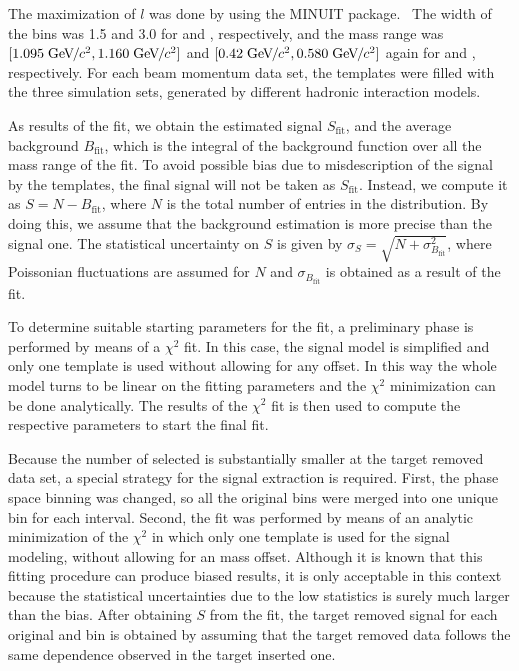 The maximization of $l$ was done by using the
MINUIT package.~\cite{James:1975dr} The width
of the \minv bins was 1.5 and 3.0 \MeVcc for
\lambs and \kzeros, respectively, and the mass range
was $[1.095\;\mbox{Ge\kern-0.1em V}\kern-0.1em/\kern-0.05em c^2, 1.160\;\mbox{Ge\kern-0.1em V}\kern-0.1em/\kern-0.05em c^2]$ and $[0.42\;\mbox{Ge\kern-0.1em V}\kern-0.1em/\kern-0.05em c^2, 0.580\;\mbox{Ge\kern-0.1em V}\kern-0.1em/\kern-0.05em c^2]$  
again for \lambs and \kzeros, respectively.
For each beam momentum data set, the templates were filled
with the three simulation sets, generated by different
hadronic interaction models.

As results of the fit, we obtain the estimated signal
$S_\text{fit}$, and the average background $B_\text{fit}$, which is the integral
of the background function over all the mass range of the fit.
To avoid possible bias due to misdescription of the signal
by the templates, the final signal will not be taken as $S_\text{fit}$.
Instead, we compute it as $S = N - B_\text{fit}$,
where $N$ is the total number of entries in the \minv distribution.
By doing this, we assume that the background estimation is more precise
than the signal one.
The statistical uncertainty on $S$ is given by $\sigma_S = \sqrt{N+\sigma_{B_\text{fit}}^2}$,
where Poissonian fluctuations are assumed for $N$ and $\sigma_{B_\text{fit}}$
is obtained as a result of the fit.

To determine suitable starting parameters for the fit,
a preliminary phase is performed by means of a $\chi^2$
fit. In this case, the signal model is simplified and
only one template is used without allowing for any offset.
In this way the whole model turns to be linear on the fitting
parameters and the $\chi^2$ minimization can be done analytically.
The results of the $\chi^2$ fit
is then used to compute the respective parameters
to start the final fit.

Because the number of selected \vzeros is substantially smaller
at the target removed data set, a special strategy for the signal
extraction is required. First, the phase space binning was
changed, so all the original \pT bins were merged
into one unique bin for each \pp interval. Second, the \minv fit was performed
by means of an analytic minimization of the $\chi^2$
in which only one template is used for the signal modeling,
without allowing for an mass offset. Although it is known that this fitting
procedure can produce biased results, it is only acceptable in this
context because the statistical uncertainties due to the low
statistics is surely much larger than the bias.
After obtaining $S$ from the \minv fit, the target removed
signal for each original \pp and \pT bin is obtained by assuming
that the target removed data follows the same \pT dependence
observed in the target inserted one.


